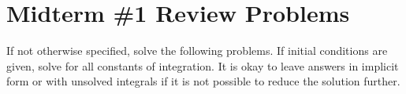 \documentclass[letterpaper, fontsize=12pt]{scrartcl} %
\numberwithin{equation}{section} %
\numberwithin{figure}{section} %
\numberwithin{table}{section} %
\begin{document}

\newcommand{\horrule}[1]{\rule{\linewidth}{#1}} %


\section*{Midterm \#1 Review Problems}
\par If not otherwise specified, solve the following problems. If initial conditions are given, solve for all constants of integration. It is okay to leave answers in implicit form or with unsolved integrals if it is not possible to reduce the solution further. 
\end{document}
